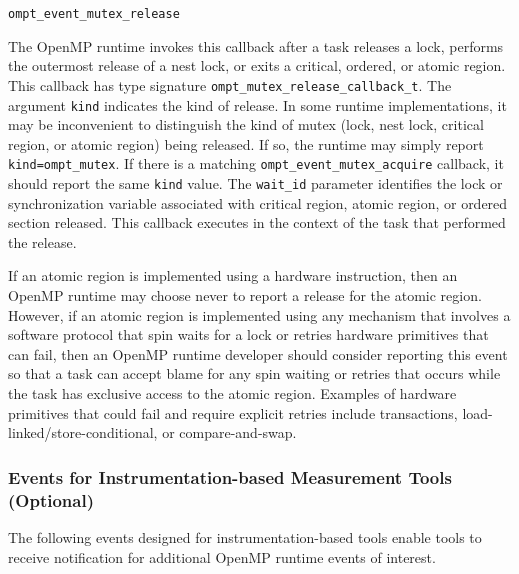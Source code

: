 \documentclass{article}
\newcommand{\descheader}[1]{{\needspace{3\baselineskip}\vspace{1em}\noindent \fbox{#1}}}
\begin{document}
\begin{description}

\item \verb|ompt_event_mutex_release| 

   The OpenMP runtime invokes this callback after a task releases a lock, performs the outermost release of a nest lock, or exits a critical, ordered, 
   or atomic region. 
   This callback has type signature \verb|ompt_mutex_release_callback_t|. 
   The argument \verb|kind| indicates the kind of release. In some runtime implementations, it may be inconvenient to distinguish the kind of mutex (lock, nest lock, 
   critical region, or atomic region) being released. If so, the runtime may simply report \verb|kind=|\verb|ompt_mutex|. If there is a matching 
   \verb|ompt_event_mutex_acquire| callback, it should report the same \verb|kind| value. 
   The \verb|wait_id| parameter identifies the lock or synchronization variable
   associated with critical region, atomic region, or ordered section released. This callback executes in the context of the task that performed the release. 
   
   If an atomic region is implemented using a hardware instruction, then an OpenMP runtime may choose never to report a release for the atomic region. 
   However, if an atomic region is implemented  using any mechanism that involves a software protocol that spin waits for a lock or retries hardware primitives
   that can fail, then an OpenMP 
   runtime developer should consider reporting this event so that a task can accept blame for any spin waiting or retries that occurs while the task has 
   exclusive access to the atomic region.
   Examples of hardware primitives that could fail and require explicit retries include transactions,  
   load-linked/store-conditional, or compare-and-swap.
   
\end{description}

\subsubsection{Events for Instrumentation-based Measurement Tools (Optional)}
\label{sec:trace-events}

The following events designed for instrumentation-based tools enable tools to receive notification for additional OpenMP runtime events of interest.

\descheader{Tasking}
\end{document}
